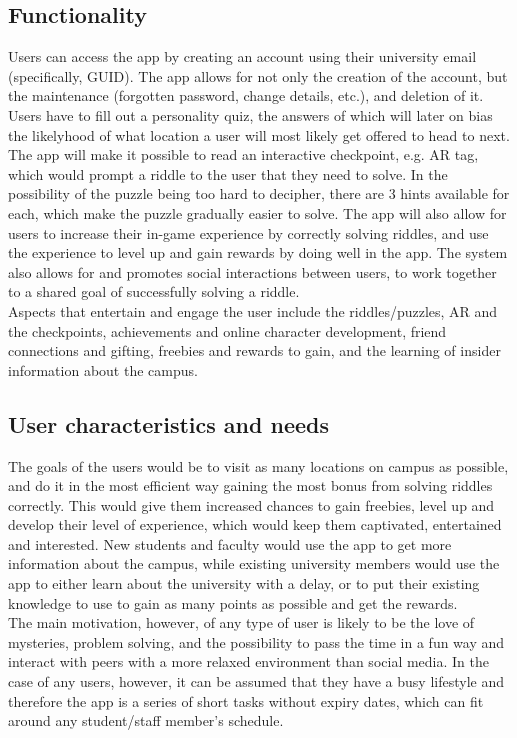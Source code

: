 \documentclass[10pt,twocolumn]{article} %
\begin{document}
\subsection*{Functionality}
Users can access the app by creating an account using their university email (specifically, GUID). The app allows for not only the creation of the account, but the maintenance (forgotten password, change details, etc.), and deletion of it. Users have to fill out a personality quiz, the answers of which will later on bias the likelyhood of what location a user will most likely get offered to head to next. The app will make it possible to read an interactive checkpoint, e.g. AR tag, which would prompt a riddle to the user that they need to solve. In the possibility of the puzzle being too hard to decipher, there are 3 hints available for each, which make the puzzle gradually easier to solve. The app will also allow for users to increase their in-game experience by correctly solving riddles, and use the experience to level up and gain rewards by doing well in the app. The system also allows for and promotes social interactions between users, to work together to a shared goal of successfully solving a riddle.\\
Aspects that entertain and engage the user include the riddles/puzzles, AR and the checkpoints, achievements and online character development, friend connections and gifting, freebies and rewards to gain, and the learning of insider information about the campus.

\subsection*{User characteristics and needs}
The goals of the users would be to visit as many locations on campus as possible, and do it in the most efficient way gaining the most bonus from solving riddles correctly. This would give them increased chances to gain freebies, level up and develop their level of experience, which would keep them captivated, entertained and interested. New students and faculty would use the app to get more information about the campus, while existing university members would use the app to either learn about the university with a delay, or to put their existing knowledge to use to gain as many points as possible and get the rewards.\\
The main motivation, however, of any type of user is likely to be the love of mysteries, problem solving, and the possibility to pass the time in a fun way and interact with peers with a more relaxed environment than social media. In the case of any users, however, it can be assumed that they have a busy lifestyle and therefore the app is a series of short tasks without expiry dates, which can fit around any student/staff member's schedule.
\end{document}
